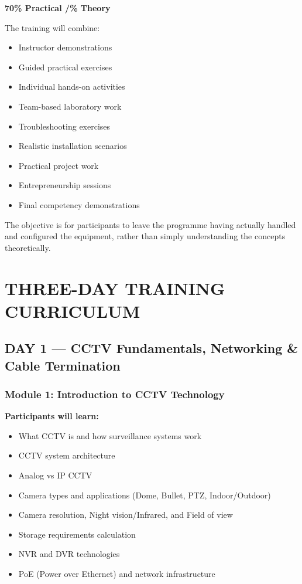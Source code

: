 \documentclass[11pt,a4paper]{article}
\begin{document}
\begin{tcolorbox}[themebox]
    {\Huge \textbf{70\% Practical \quad/\% Theory}}
\end{tcolorbox}

\noindent The training will combine:
\begin{itemize}
    \item Instructor demonstrations
    \item Guided practical exercises
    \item Individual hands-on activities
    \item Team-based laboratory work
    \item Troubleshooting exercises
    \item Realistic installation scenarios
    \item Practical project work
    \item Entrepreneurship sessions
    \item Final competency demonstrations
\end{itemize}
The objective is for participants to leave the programme having actually handled and configured the equipment, rather than simply understanding the concepts theoretically.

\section{THREE-DAY TRAINING CURRICULUM}

\subsection{DAY 1 — CCTV Fundamentals, Networking \& Cable Termination}

\subsubsection{Module 1: Introduction to CCTV Technology}
\textbf{Participants will learn:}
\begin{itemize}
    \item What CCTV is and how surveillance systems work
    \item CCTV system architecture
    \item Analog vs IP CCTV
    \item Camera types and applications (Dome, Bullet, PTZ, Indoor/Outdoor)
    \item Camera resolution, Night vision/Infrared, and Field of view
    \item Storage requirements calculation
    \item NVR and DVR technologies
    \item PoE (Power over Ethernet) and network infrastructure
\end{itemize}
\end{document}

